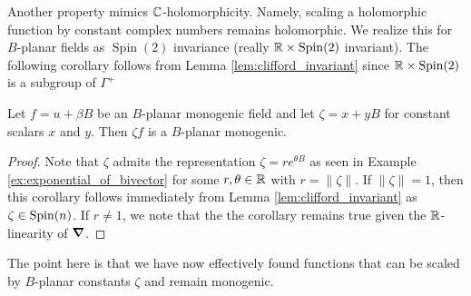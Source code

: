 Another property mimics $\mathbb{C}$-holomorphicity.  Namely, scaling a holomorphic function by constant complex numbers remains holomorphic. We realize this for $B$-planar fields as $\operatorname{Spin}(2)$ invariance (really $\mathbb{R} \times \operatorname{Spin}(2)$ invariant).  The following corollary follows from Lemma \ref{lem:clifford_invariant} since $\mathbb{R} \times \operatorname{Spin}(2)$ is a subgroup of $\Gamma^+$ 
\begin{corollary}
    \label{cor:mult_by_i_monogenic}
    Let $f=u+\beta B$ be an $B$-planar monogenic field and let $\zeta=x+yB$ for constant scalars $x$ and $y$. Then $\zeta f$ is a $B$-planar monogenic.
\end{corollary}
\begin{proof}
    Note that $\zeta$ admits the representation $\zeta = re^{\theta B}$ as seen in Example \ref{ex:exponential_of_bivector} for some $r,\theta \in \mathbb{R}$ with $r= \|\zeta\|$. If $\|\zeta\|=1$, then this corollary follows immediately from Lemma \ref{lem:clifford_invariant} as $\zeta \in \operatorname{Spin}(n)$. If $r\neq 1$, we note that the the corollary remains true given the $\mathbb{R}$-linearity of $\boldsymbol{\nabla}$.
\end{proof}
The point here is that we have now effectively found functions that can be scaled by $B$-planar constants $\zeta$ and remain monogenic. 
 
